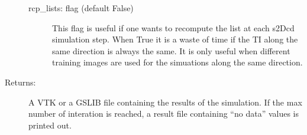 \documentclass[letterpaper,10pt,english]{sphinxmanual}
\begin{document}
\begin{fulllineitems}
\begin{description}
\begin{description}
\item[{rcp\_lists: flag (default False)}] \leavevmode
This flag is useful if one wants to re\sphinxhyphen{}compute the list
at each s2Dcd simulation step. When True it is a waste of time
if the TI along the same direction is always the same. It is
only useful when different training images are used for
the simuations along the same direction.

\end{description}

\item[{Returns:}] \leavevmode
A VTK or a GSLIB file containing the results of the simulation.
If the max number of interation is reached, a result file
containing “no data” values is printed out.

\end{description}

\end{fulllineitems}

\end{document}
